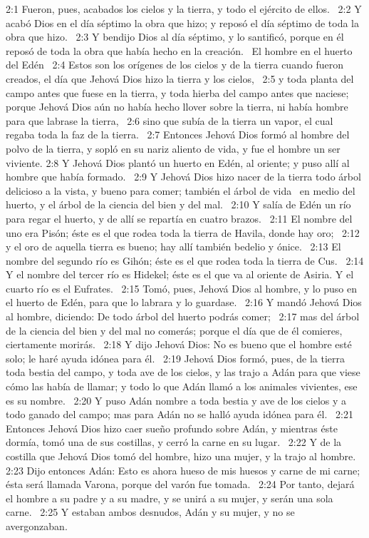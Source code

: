 2:1 Fueron, pues, acabados los cielos y la tierra, y todo el ejército de ellos.  
2:2 Y acabó Dios en el día séptimo la obra que hizo; y reposó el día séptimo de toda la obra que hizo.  
2:3 Y bendijo Dios al día séptimo, y lo santificó, porque en él reposó de toda la obra que había hecho en la creación.  
El hombre en el huerto del Edén  
2:4 Estos son los orígenes de los cielos y de la tierra cuando fueron creados, el día que Jehová Dios hizo la tierra y los cielos,  
2:5 y toda planta del campo antes que fuese en la tierra, y toda hierba del campo antes que naciese; porque Jehová Dios aún no había hecho llover sobre la tierra, ni había hombre para que labrase la tierra,  
2:6 sino que subía de la tierra un vapor, el cual regaba toda la faz de la tierra.  
2:7 Entonces Jehová Dios formó al hombre del polvo de la tierra, y sopló en su nariz aliento de vida, y fue el hombre un ser viviente. 
2:8 Y Jehová Dios plantó un huerto en Edén, al oriente; y puso allí al hombre que había formado.  
2:9 Y Jehová Dios hizo nacer de la tierra todo árbol delicioso a la vista, y bueno para comer; también el árbol de vida  en medio del huerto, y el árbol de la ciencia del bien y del mal.  
2:10 Y salía de Edén un río para regar el huerto, y de allí se repartía en cuatro brazos.  
2:11 El nombre del uno era Pisón; éste es el que rodea toda la tierra de Havila, donde hay oro;  
2:12 y el oro de aquella tierra es bueno; hay allí también bedelio y ónice.  
2:13 El nombre del segundo río es Gihón; éste es el que rodea toda la tierra de Cus.  
2:14 Y el nombre del tercer río es Hidekel; éste es el que va al oriente de Asiria. Y el cuarto río es el Eufrates.  
2:15 Tomó, pues, Jehová Dios al hombre, y lo puso en el huerto de Edén, para que lo labrara y lo guardase.  
2:16 Y mandó Jehová Dios al hombre, diciendo: De todo árbol del huerto podrás comer;  
2:17 mas del árbol de la ciencia del bien y del mal no comerás; porque el día que de él comieres, ciertamente morirás.  
2:18 Y dijo Jehová Dios: No es bueno que el hombre esté solo; le haré ayuda idónea para él.  
2:19 Jehová Dios formó, pues, de la tierra toda bestia del campo, y toda ave de los cielos, y las trajo a Adán para que viese cómo las había de llamar; y todo lo que Adán llamó a los animales vivientes, ese es su nombre.  
2:20 Y puso Adán nombre a toda bestia y ave de los cielos y a todo ganado del campo; mas para Adán no se halló ayuda idónea para él.  
2:21 Entonces Jehová Dios hizo caer sueño profundo sobre Adán, y mientras éste dormía, tomó una de sus costillas, y cerró la carne en su lugar.  
2:22 Y de la costilla que Jehová Dios tomó del hombre, hizo una mujer, y la trajo al hombre.  
2:23 Dijo entonces Adán: Esto es ahora hueso de mis huesos y carne de mi carne; ésta será llamada Varona, porque del varón fue tomada.  
2:24 Por tanto, dejará el hombre a su padre y a su madre, y se unirá a su mujer, y serán una sola carne.  
2:25 Y estaban ambos desnudos, Adán y su mujer, y no se avergonzaban.  

